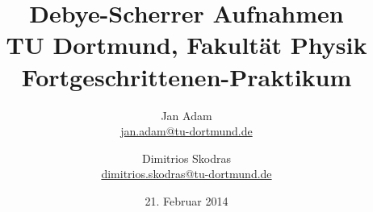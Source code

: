 



\title{Debye-Scherrer Aufnahmen\\				%
\large TU Dortmund, Fakultät Physik\\ 
\normalsize Fortgeschrittenen-Praktikum}

\author{Jan Adam\\			%
{\small \href{jan.adam@tu-dortmund.de}{jan.adam@tu-dortmund.de}}	%
\and						%
Dimitrios Skodras\\					%
{\small \href{dimitrios.skodras@tu-dortmund.de}{dimitrios.skodras@tu-dortmund.de}}		%
}
\date{21. Februar 2014}				%





\maketitle					%
\thispagestyle{empty} 				%



\tableofcontents


\newpage					%


